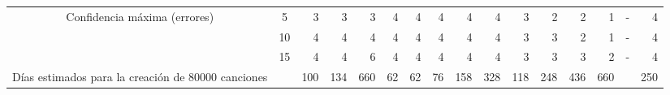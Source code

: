 \begin{sidewaystable}
\begin{tabular}{@{}ccc|rrrrrrrrrrrrrr@{}}
\midrule
\multicolumn{2}{c}{\multirow{3}{*}{Confidencia máxima (errores)}}  & 5                    & 3                      & 3                      & 3                      & 4                      & 4                      & 4                      & 4                      & 4                      & 3                      & 2                      & 2                      & 1                      & -                      & 4                      \\
\multicolumn{2}{c}{}                                               & 10                   & 4                      & 4                      & 4                      & 4                      & 4                      & 4                      & 4                      & 4                      & 3                      & 3                      & 2                      & 1                      & -                      & 4                      \\
\multicolumn{2}{c}{}                                               & 15                   & 4                      & 4                      & 6                      & 4                      & 4                      & 4                      & 4                      & 4                      & 3                      & 3                      & 3                      & 2                      & -                      & 4                      \\
\midrule
\multicolumn{2}{c}{Días estimados para la creación de 80000 canciones}         &                      & 100                    & 134                    & 660                    & 62                     & 62                     & 76                     & 158                    & 328                    & 118                    & 248                    & 436                    & 660                    &                        & 250                    \\ \midrule \bottomrule


\end{tabular}
\end{sidewaystable}

